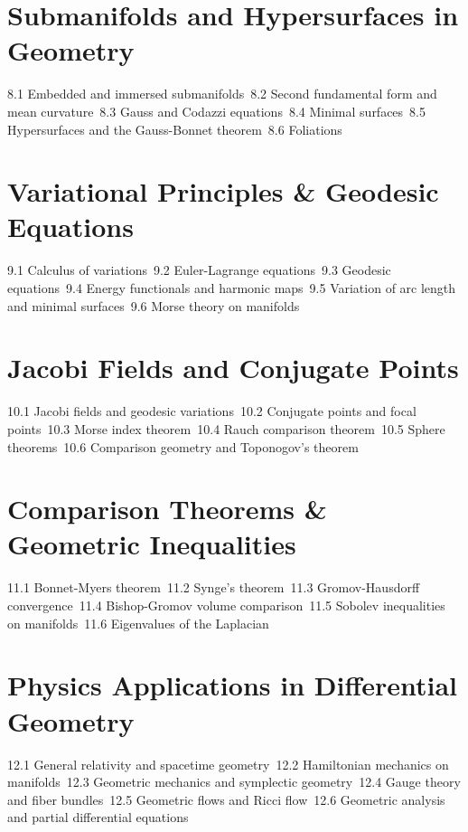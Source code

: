 \section{Submanifolds and Hypersurfaces in Geometry}
8.1 Embedded and immersed submanifolds\
8.2 Second fundamental form and mean curvature\
8.3 Gauss and Codazzi equations\
8.4 Minimal surfaces\
8.5 Hypersurfaces and the Gauss-Bonnet theorem\
8.6 Foliations\
\section{Variational Principles \& Geodesic Equations}
9.1 Calculus of variations\
9.2 Euler-Lagrange equations\
9.3 Geodesic equations\
9.4 Energy functionals and harmonic maps\
9.5 Variation of arc length and minimal surfaces\
9.6 Morse theory on manifolds\
\section{Jacobi Fields and Conjugate Points}
10.1 Jacobi fields and geodesic variations\
10.2 Conjugate points and focal points\
10.3 Morse index theorem\
10.4 Rauch comparison theorem\
10.5 Sphere theorems\
10.6 Comparison geometry and Toponogov's theorem\
\section{Comparison Theorems \& Geometric Inequalities}
11.1 Bonnet-Myers theorem\
11.2 Synge's theorem\
11.3 Gromov-Hausdorff convergence\
11.4 Bishop-Gromov volume comparison\
11.5 Sobolev inequalities on manifolds\
11.6 Eigenvalues of the Laplacian\
\section{Physics Applications in Differential Geometry}
12.1 General relativity and spacetime geometry\
12.2 Hamiltonian mechanics on manifolds\
12.3 Geometric mechanics and symplectic geometry\
12.4 Gauge theory and fiber bundles\
12.5 Geometric flows and Ricci flow\
12.6 Geometric analysis and partial differential equations\
